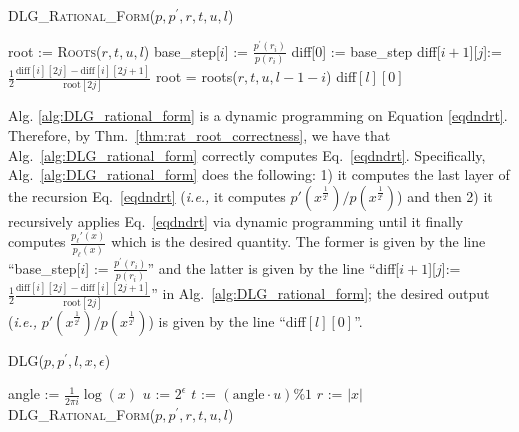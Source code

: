 \documentclass[runningheads]{llncs}
\begin{document}

\begin{algorithm}
\caption{\textsc{DLG\_Rational\_Form}($p,p^\prime,r,t,u,l$)}
\label{alg:DLG_rational_form}
\begin{algorithmic}
\STATE 	root      := \textsc{Roots}($r,t,u,l$)
\STATE 	base\_step[$i$] := $\frac{p^\prime(r_i)}{p(r_i)}$
\ENDFOR
\STATE  diff[0]   := base\_step
\STATE 			diff[$i+1$][$j$]:=$\frac{1}{2}\frac{\text{diff}[i][2j]-\text{diff}[i][2j+1]}{\text{root}[2j]}$
\STATE 		root = roots($r,t,u,l-1-i$)
\ENDFOR
\ENDFOR
\RETURN diff$[l][0]$
\end{algorithmic}
\end{algorithm}
Alg. \ref{alg:DLG_rational_form} is a dynamic programming on Equation \ref{eqdndrt}. Therefore, by Thm.~\ref{thm:rat_root_correctness}, we have that Alg.~\ref{alg:DLG_rational_form} correctly computes Eq.~\ref{eqdndrt}.
Specifically, Alg.~\ref{alg:DLG_rational_form} does the following: 1) it computes the last layer of the recursion Eq.~\ref{eqdndrt} (\emph{i.e.,} it computes $p'(x^{\frac{1}{2^l}})/p(x^{\frac{1}{2^l}})$) and then 2) it recursively applies Eq.~\ref{eqdndrt} via dynamic programming until it finally computes $\frac{p_{\ell}'(x)}{p_{\ell}(x)}$ which is the desired quantity.
The former is given by the line ``base\_step[$i$] := $\frac{p^\prime(r_i)}{p(r_i)}$'' and the latter is given by the line ``diff[$i+1$][$j$]:=$\frac{1}{2}\frac{\text{diff}[i][2j]-\text{diff}[i][2j+1]}{\text{root}[2j]}$'' in Alg.~\ref{alg:DLG_rational_form}; the desired output (\emph{i.e.,} $p'(x^{\frac{1}{2^l}})/p(x^{\frac{1}{2^l}})$) is given by the line ``diff$[l][0]$''.




\begin{algorithm}
\caption{\textsc{DLG}($p,p^\prime,l,x, \epsilon$)}
\label{alg:rational_angle_approx}
\begin{algorithmic}
\STATE angle     := $\frac{1}{2\pi i} \log (x)$
\STATE $u $    := $2^{\epsilon}$
\STATE$t$      :=  $(\text{angle} \cdot u)\% 1$
\STATE $r$      := $|x|$
\RETURN \textsc{DLG\_Rational\_Form}($p,p^\prime,r,t,u,l$)
\end{algorithmic}
\end{algorithm}

%




\end{document}

